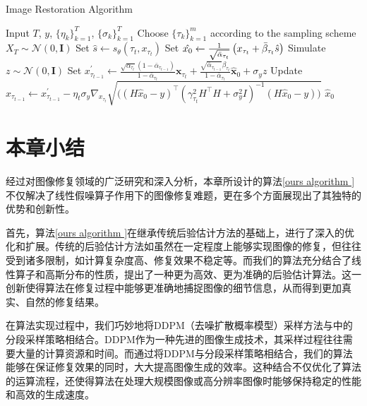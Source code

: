 \begin{breakablealgorithm}
\caption{Image Restoration Algorithm }
\label{ours algorithm }
    \begin{algorithmic}[1]
   \REQUIRE Input $T$, $y$, $\{\eta_k\}_{k=1}^{T}$, $\{\sigma_k\}_{k=1}^{T}$
   \REQUIRE Choose $\{\tau_k\}_{k=1}^{m}$ according to the sampling scheme
   \STATE $X_{T}\sim \mathcal{N}(0,\boldsymbol{I})$
   \STATE Set $\hat{s}\xleftarrow{} s_{\theta}(\tau_t,x_{\tau_t})$
   \STATE Set $\hat{x_0} \xleftarrow{} \frac{1}{\sqrt{\Bar{\alpha}_{\tau_t}}}\left(x_{\tau_t}+\Bar{\beta}_{\tau_t}\hat{s}\right)$
   \STATE Simulate $z\sim \mathcal{N}(0,\boldsymbol{I})$
   \STATE Set $x^{\prime}_{\tau_{t-1}}\xleftarrow{} \frac{\sqrt{\alpha_{\tau_t}}\left(1-\bar{\alpha}_{\tau_{t-1}}\right)}{1-\bar{\alpha}_{\tau_t}} \boldsymbol{x}_{\tau_t}+\frac{\sqrt{\bar{\alpha}_{\tau_{t-1}}} \beta_{\tau_t}}{1-\bar{\alpha}_{\tau_t}} \hat{\boldsymbol{x}}_0+\sigma_{y} {z} $
   \STATE Update $x_{\tau_{t-1}}\xleftarrow{} {x}_{\tau_{t-1}}^{\prime}-\eta_t \sigma_y \nabla_{x_{\tau_t}}\sqrt{((H\hat{x}_0-y)^{\top}\left(\gamma_{\tau_t}^2 H^{\top}H + \sigma_y^2 I\right)^{-1}(H\hat{x}_0-y)\bigg)}$
   \ENDFOR
   \RETURN $\hat{x}_0$ 
    \end{algorithmic}
\end{breakablealgorithm}











\section{本章小结}
经过对图像修复领域的广泛研究和深入分析，本章所设计的算法\ref{ours algorithm }不仅解决了线性假噪算子作用下的图像修复难题，更在多个方面展现出了其独特的优势和创新性。    




首先，算法\ref{ours algorithm }在继承传统后验估计方法的基础上，进行了深入的优化和扩展。传统的后验估计方法如\cite{Inverse}虽然在一定程度上能够实现图像的修复，但往往受到诸多限制，如计算复杂度高、修复效果不稳定等。而我们的算法充分结合了线性算子和高斯分布的性质，提出了一种更为高效、更为准确的后验估计算法。这一创新使得算法在修复过程中能够更准确地捕捉图像的细节信息，从而得到更加真实、自然的修复结果。   


在算法实现过程中，我们巧妙地将DDPM（去噪扩散概率模型）采样方法与\cite{DDIM}中的分段采样策略相结合。DDPM作为一种先进的图像生成技术，其采样过程往往需要大量的计算资源和时间。而通过将DDPM与分段采样策略相结合，我们的算法能够在保证修复效果的同时，大大提高图像生成的效率。这种结合不仅优化了算法的运算流程，还使得算法在处理大规模图像或高分辨率图像时能够保持稳定的性能和高效的生成速度。     


